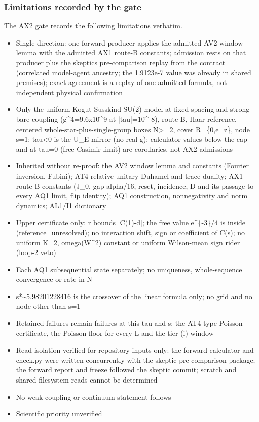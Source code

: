 \subsubsection{Limitations recorded by the gate}
\label{sec:ax2-limits}
The AX2 gate records the following limitations verbatim.
\begin{gatequote}
\begin{itemize}
\item Single direction: one forward producer applies the admitted AV2 window
lemma with the admitted AX1 route-B constants; admission rests on that
producer plus the skeptic\textquotesingle{}s pre-comparison replay from the
contract (correlated model-agent ancestry; the 1.9123e-7 value was already in
shared premises); exact agreement is a replay of one admitted formula, not
independent physical confirmation
\item Only the uniform Kogut-Susskind SU(2) model at fixed spacing and strong
bare coupling (g\textasciicircum{}4=9.6x10\textasciicircum{}9 at
|tau|=10\textasciicircum{}-8), route B, Haar reference, centered
whole-star-plus-single-group boxes N>=2, cover R=\{0,e\_z\}, node s=1; tau<0
is the U\_E mirror (no real g); calculator values below the cap and at tau=0
(free Casimir limit) are corollaries, not AX2 admissions
\item Inherited without re-proof: the AV2 window lemma and constants (Fourier
inversion, Fubini); AT4 relative-unitary Duhamel and trace duality; AX1
route-B constants (J\_0\textquotesingle{}, gap alpha/16, reset, incidence,
D\textquotesingle{} and its passage to every AQ1 limit, flip identity); AQ1
construction, nonnegativity and norm dynamics; AL1/I1 dictionary
\item Upper certificate only: r bounds |C(1)-d|; the free value
e\textasciicircum{}\{-3\}/4 is inside (reference\_unresolved); no interaction
shift, sign or coefficient of C(s); no uniform K\_2,
omega(W\textasciicircum{}2) constant or uniform Wilson-mean sign rider (loop-2
veto)
\item Each AQ1 subsequential state separately; no uniqueness, whole-sequence
convergence or rate in N
\item s*\textasciitilde{}5.98201228416 is the crossover of the linear formula
only; no grid and no node other than s=1
\item Retained failures remain failures at this tau and s: the AT4-type
Poisson certificate, the Poisson floor for every L and the tier-(i) window
\item Read isolation verified for repository inputs only: the forward
calculator and check.py were written concurrently with the skeptic
pre-comparison package; the forward report and freeze followed the skeptic
commit; scratch and shared-filesystem reads cannot be determined
\item No weak-coupling or continuum statement follows
\item Scientific priority unverified
\end{itemize}
\end{gatequote}
